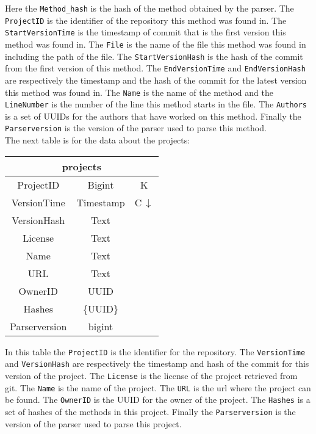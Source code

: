 \documentclass[../Main.tex]{subfiles}
\begin{document}
Here the \texttt{Method\_hash} is the hash of the method obtained by the parser. The \texttt{ProjectID} is the identifier of the repository this method was found in. The \texttt{StartVersionTime} is the timestamp of commit that is the first version this method was found in. The \texttt{File} is the name of the file this method was found in including the path of the file. The \texttt{StartVersionHash} is the hash of the commit from the first version of this method. The \texttt{EndVersionTime} and \texttt{EndVersionHash} are respectively the timestamp and the hash of the commit for the latest version this method was found in. The \texttt{Name} is the name of the method and the \texttt{LineNumber} is the number of the line this method starts in the file. The \texttt{Authors} is a set of UUIDs for the authors that have worked on this method. Finally the \texttt{Parserversion} is the version of the parser used to parse this method.\\

The next table is for the data about the projects:

\begin{table}[h]
    \centering
\begin{tabular}{|ccc|}
    \hline
    \multicolumn{3}{|c|}{\textbf{projects}} \\ \hline
    ProjectID & Bigint & K \\
    VersionTime & Timestamp & C\,$\downarrow$ \\
    VersionHash & Text & \\
    License & Text & \\
    Name & Text & \\ 
    URL & Text & \\
    OwnerID & UUID & \\
    Hashes & \{UUID\} & \\
    Parserversion & bigint & \\
    \hline
\end{tabular}
\end{table}

In this table the \texttt{ProjectID} is the identifier for the repository. The \texttt{VersionTime} and \texttt{VersionHash} are respectively the timestamp and hash of the commit for this version of the project. The \texttt{License} is the license of the project retrieved from git. The \texttt{Name} is the name of the project. The \texttt{URL} is the url where the project can be found. The \texttt{OwnerID} is the UUID for the owner of the project. The \texttt{Hashes} is a set of hashes of the methods in this project. Finally the \texttt{Parserversion} is the version of the parser used to parse this project.\\
\end{document}
